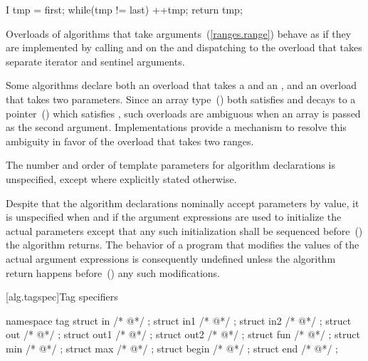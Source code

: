 \begin{codeblock}
I tmp = first;
while(tmp != last)
  ++tmp;
return tmp;
\end{codeblock}

\pnum
Overloads of algorithms that take  arguments~(\ref{ranges.range})
behave as if they are implemented by calling  and  on
the  and dispatching to the overload that takes separate
iterator and sentinel arguments.

\pnum
Some algorithms declare both an overload that takes a 
and an , and an overload that takes two 
parameters. Since an array type~() both satisfies
 and decays to a pointer~() which satisfies
, such overloads are ambiguous when an array is passed as
the second argument. Implementations provide a mechanism to resolve
this ambiguity in favor of the overload that takes two ranges.

\pnum
The number and order of template parameters for algorithm declarations
is unspecified, except where explicitly stated otherwise.

\pnum
Despite that the algorithm declarations nominally accept parameters
by value, it is unspecified when and if the argument expressions are used to
initialize the actual parameters except that any such initialization shall be
sequenced before~() the algorithm returns.
\enternote The behavior of a program that modifies the values of the actual
argument expressions is consequently undefined unless the algorithm return
happens before~() any such modifications. \exitnote

[alg.tagspec]{Tag specifiers}

\begin{itemdecl}
namespace tag {
  struct in { /* @\impdef@ */ };
  struct in1 { /* @\impdef@ */ };
  struct in2 { /* @\impdef@ */ };
  struct out { /* @\impdef@ */ };
  struct out1 { /* @\impdef@ */ };
  struct out2 { /* @\impdef@ */ };
  struct fun { /* @\impdef@ */ };
  struct min { /* @\impdef@ */ };
  struct max { /* @\impdef@ */ };
  struct begin { /* @\impdef@ */ };
  struct end { /* @\impdef@ */ };
}
\end{itemdecl}

